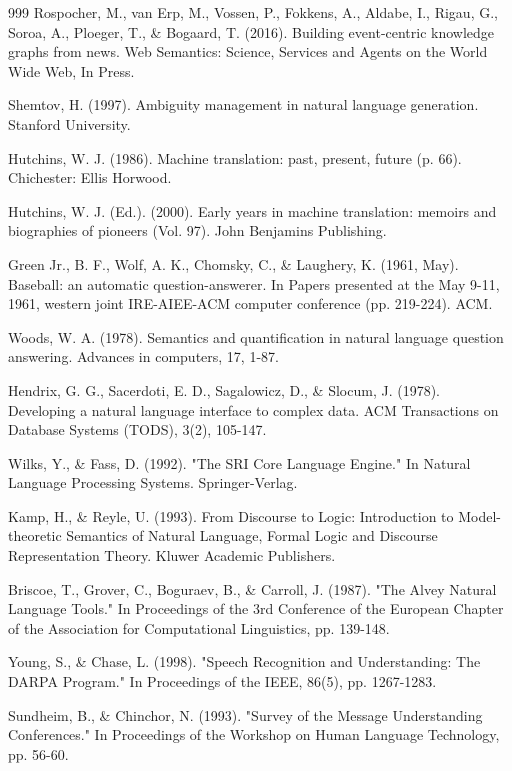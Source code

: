 \begin{thebibliography}{999}
 Rospocher, M., van Erp, M., Vossen, P., Fokkens, A., Aldabe, I., Rigau, G., Soroa, A., Ploeger, T., \& Bogaard, T. (2016). Building event-centric knowledge graphs from news. Web Semantics: Science, Services and Agents on the World Wide Web, In Press.

 Shemtov, H. (1997). Ambiguity management in natural language generation. Stanford University.

 Hutchins, W. J. (1986). Machine translation: past, present, future (p. 66). Chichester: Ellis Horwood.

 Hutchins, W. J. (Ed.). (2000). Early years in machine translation: memoirs and biographies of pioneers (Vol. 97). John Benjamins Publishing.

 Green Jr., B. F., Wolf, A. K., Chomsky, C., \& Laughery, K. (1961, May). Baseball: an automatic question-answerer. In Papers presented at the May 9-11, 1961, western joint IRE-AIEE-ACM computer conference (pp. 219-224). ACM.

 Woods, W. A. (1978). Semantics and quantification in natural language question answering. Advances in computers, 17, 1-87.

 Hendrix, G. G., Sacerdoti, E. D., Sagalowicz, D., \& Slocum, J. (1978). Developing a natural language interface to complex data. ACM Transactions on Database Systems (TODS), 3(2), 105-147.

 Wilks, Y., \& Fass, D. (1992). "The SRI Core Language Engine." In Natural Language Processing Systems. Springer-Verlag.

 Kamp, H., \& Reyle, U. (1993). From Discourse to Logic: Introduction to Model- theoretic Semantics of Natural Language, Formal Logic and Discourse Representation Theory. Kluwer Academic Publishers.

 Briscoe, T., Grover, C., Boguraev, B., \& Carroll, J. (1987). "The Alvey Natural Language Tools." In Proceedings of the 3rd Conference of the European Chapter of the Association for Computational Linguistics, pp. 139-148.

 Young, S., \& Chase, L. (1998). "Speech Recognition and Understanding: The DARPA Program." In Proceedings of the IEEE, 86(5), pp. 1267-1283.

 Sundheim, B., \& Chinchor, N. (1993). "Survey of the Message Understanding Conferences." In Proceedings of the Workshop on Human Language Technology, pp. 56-60.


\end{thebibliography}
